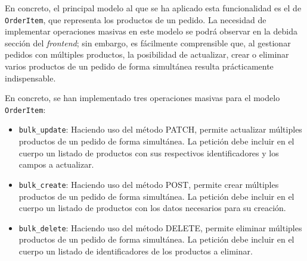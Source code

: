 En concreto, el principal modelo al que se ha aplicado esta funcionalidad es el de \texttt{OrderItem}, que representa los productos de un pedido. La necesidad de implementar operaciones masivas en este modelo se podrá observar en la debida sección del \textit{frontend}; sin embargo, es fácilmente comprensible que, al gestionar pedidos con múltiples productos, la posibilidad de actualizar, crear o eliminar varios productos de un pedido de forma simultánea resulta prácticamente indispensable.

En concreto, se han implementado tres operaciones masivas para el modelo \texttt{OrderItem}:

\begin{itemize}
    \item \texttt{bulk\_update}: Haciendo uso del método PATCH, permite actualizar múltiples productos de un pedido de forma simultánea. La petición debe incluir en el cuerpo un listado de productos con sus respectivos identificadores y los campos a actualizar.
    \item \texttt{bulk\_create}: Haciendo uso del método POST, permite crear múltiples productos de un pedido de forma simultánea. La petición debe incluir en el cuerpo un listado de productos con los datos necesarios para su creación.
    \item \texttt{bulk\_delete}: Haciendo uso del método DELETE, permite eliminar múltiples productos de un pedido de forma simultánea. La petición debe incluir en el cuerpo un listado de identificadores de los productos a eliminar.
\end{itemize}